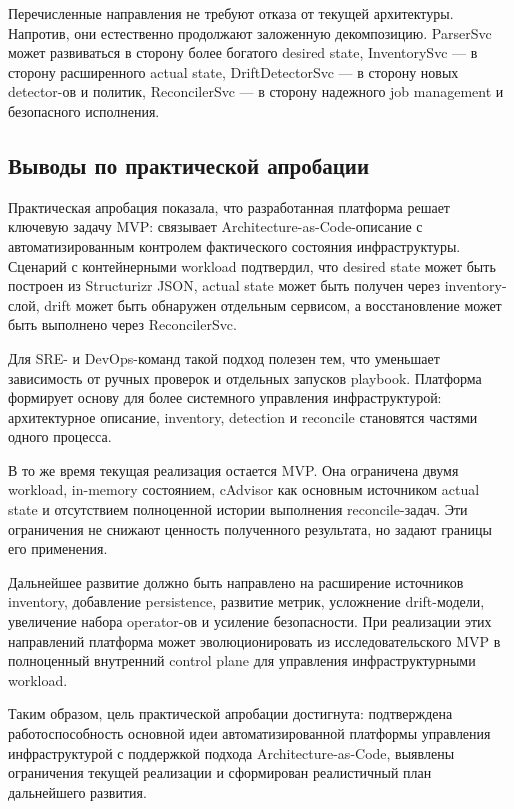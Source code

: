 Перечисленные направления не требуют отказа от текущей архитектуры. Напротив, они естественно продолжают заложенную декомпозицию. ParserSvc может развиваться в сторону более богатого desired state, InventorySvc --- в сторону расширенного actual state, DriftDetectorSvc --- в сторону новых detector-ов и политик, ReconcilerSvc --- в сторону надежного job management и безопасного исполнения.

\subsection{Выводы по практической апробации}

Практическая апробация показала, что разработанная платформа решает ключевую задачу MVP: связывает Architecture-as-Code-описание с автоматизированным контролем фактического состояния инфраструктуры. Сценарий с контейнерными workload подтвердил, что desired state может быть построен из Structurizr JSON, actual state может быть получен через inventory-слой, drift может быть обнаружен отдельным сервисом, а восстановление может быть выполнено через ReconcilerSvc.

Для SRE- и DevOps-команд такой подход полезен тем, что уменьшает зависимость от ручных проверок и отдельных запусков playbook. Платформа формирует основу для более системного управления инфраструктурой: архитектурное описание, inventory, detection и reconcile становятся частями одного процесса.

В то же время текущая реализация остается MVP. Она ограничена двумя workload, in-memory состоянием, cAdvisor как основным источником actual state и отсутствием полноценной истории выполнения reconcile-задач. Эти ограничения не снижают ценность полученного результата, но задают границы его применения.

Дальнейшее развитие должно быть направлено на расширение источников inventory, добавление persistence, развитие метрик, усложнение drift-модели, увеличение набора operator-ов и усиление безопасности. При реализации этих направлений платформа может эволюционировать из исследовательского MVP в полноценный внутренний control plane для управления инфраструктурными workload.

Таким образом, цель практической апробации достигнута: подтверждена работоспособность основной идеи автоматизированной платформы управления инфраструктурой с поддержкой подхода Architecture-as-Code, выявлены ограничения текущей реализации и сформирован реалистичный план дальнейшего развития.
